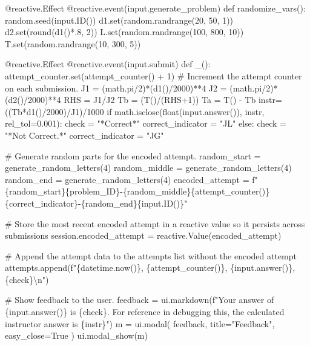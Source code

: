 \documentclass[
  letterpaper,
  DIV=11,
  numbers=noendperiod]{scrreprt}
\newenvironment{Shaded}{\begin{snugshade}}{\end{snugshade}}
\newcommand{\NormalTok}[1]{\textcolor[rgb]{0.00,0.23,0.31}{#1}}
\begin{document}
\begin{Shaded}
\begin{Highlighting}[]
\NormalTok{    @reactive.Effect}
\NormalTok{    @reactive.event(input.generate\_problem)}
\NormalTok{    def randomize\_vars():}
\NormalTok{        random.seed(input.ID())}
\NormalTok{        d1.set(random.randrange(20, 50, 1))}
\NormalTok{        d2.set(round(d1()*.8, 2))}
\NormalTok{        L.set(random.randrange(100, 800, 10))}
\NormalTok{        T.set(random.randrange(10, 300, 5))}
        
\NormalTok{    @reactive.Effect}
\NormalTok{    @reactive.event(input.submit)}
\NormalTok{    def \_():}
\NormalTok{        attempt\_counter.set(attempt\_counter() + 1)  \# Increment the attempt counter on each submission.}
\NormalTok{        J1 = (math.pi/2)*(d1()/2000)**4}
\NormalTok{        J2 = (math.pi/2)*(d2()/2000)**4}
\NormalTok{        RHS = J1/J2}
\NormalTok{        Tb = (T()/(RHS+1))}
\NormalTok{        Ta = T() {-} Tb}
\NormalTok{        instr= ((Tb*d1()/2000)/J1)/1000}
\NormalTok{        if math.isclose(float(input.answer()), instr, rel\_tol=0.001):}
\NormalTok{            check = "*Correct*"}
\NormalTok{            correct\_indicator = "JL"}
\NormalTok{        else:}
\NormalTok{            check = "*Not Correct.*"}
\NormalTok{            correct\_indicator = "JG"}

\NormalTok{        \# Generate random parts for the encoded attempt.}
\NormalTok{        random\_start = generate\_random\_letters(4)}
\NormalTok{        random\_middle = generate\_random\_letters(4)}
\NormalTok{        random\_end = generate\_random\_letters(4)}
\NormalTok{        encoded\_attempt = f"\{random\_start\}\{problem\_ID\}{-}\{random\_middle\}\{attempt\_counter()\}\{correct\_indicator\}{-}\{random\_end\}\{input.ID()\}"}

\NormalTok{        \# Store the most recent encoded attempt in a reactive value so it persists across submissions}
\NormalTok{        session.encoded\_attempt = reactive.Value(encoded\_attempt)}

\NormalTok{        \# Append the attempt data to the attempts list without the encoded attempt}
\NormalTok{        attempts.append(f"\{datetime.now()\}, \{attempt\_counter()\}, \{input.answer()\}, \{check\}\textbackslash{}n")}

\NormalTok{        \# Show feedback to the user.}
\NormalTok{        feedback = ui.markdown(f"Your answer of \{input.answer()\} is \{check\}. For reference in debugging this, the calculated instructor answer is \{instr\}")}
\NormalTok{        m = ui.modal(}
\NormalTok{            feedback,}
\NormalTok{            title="Feedback",}
\NormalTok{            easy\_close=True}
\NormalTok{        )}
\NormalTok{        ui.modal\_show(m)}


\end{Highlighting}
\end{Shaded}
\end{document}
